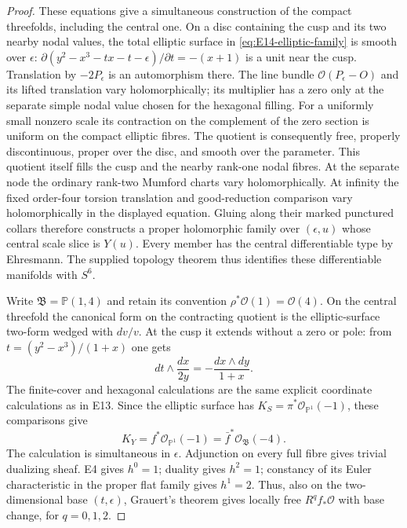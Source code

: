 \begin{proof}
These equations give a simultaneous construction of the compact
threefolds, including the central one. On a disc containing the cusp
and its two nearby nodal values, the total elliptic surface in
\eqref{eq:E14-elliptic-family} is smooth over $\epsilon$:
$\partial(y^2-x^3-tx-t-\epsilon)/\partial t=-(x+1)$ is a unit
near the cusp. Translation by $-2P_\epsilon$ is an automorphism
there. The line bundle $\mathcal O(P_\epsilon-O)$ and its lifted
translation vary holomorphically; its multiplier has a zero only
at the separate simple nodal value chosen for the hexagonal filling.
For a uniformly small nonzero scale its contraction on the
complement of the zero section is uniform on the compact elliptic
fibres. The quotient is consequently free, properly discontinuous,
proper over the disc, and smooth over the parameter. This quotient
itself fills the cusp and the nearby rank-one nodal fibres. At the
separate node the ordinary rank-two Mumford charts vary
holomorphically. At infinity the fixed order-four torsion translation
and good-reduction comparison vary holomorphically in the displayed
equation. Gluing along their marked punctured collars therefore
constructs a proper holomorphic family over $(\epsilon,u)$ whose
central scale slice is $Y(u)$. Every member has the central
differentiable type by Ehresmann. The supplied topology theorem
\cite[Theorem labelled \texttt{thm: main}]{LiuRollenske2026} thus
identifies these differentiable manifolds with $S^6$.

Write $\mathfrak B=\mathbb P(1,4)$ and retain its convention
$\rho^*\mathcal O(1)=\mathcal O(4)$. On the central threefold the
canonical form on the contracting quotient is the elliptic-surface
two-form wedged with $dv/v$. At the cusp it extends without a zero
or pole: from $t=(y^2-x^3)/(1+x)$ one gets
\[
 dt\wedge\frac{dx}{2y}=-\frac{dx\wedge dy}{1+x}.
\]
The finite-cover and hexagonal calculations are the same explicit
coordinate calculations as in E13. Since the elliptic surface has
$K_S=\pi^*\mathcal O_{\mathbb P^1}(-1)$, these comparisons give
\begin{equation}\label{eq:E14-canonical}
 K_Y=f^*\mathcal O_{\mathbb P^1}(-1)
     =\bar f^*\mathcal O_{\mathfrak B}(-4).
\end{equation}
The calculation is simultaneous in $\epsilon$. Adjunction on every
full fibre gives trivial dualizing sheaf. E4 gives $h^0=1$;
duality gives $h^2=1$; constancy of its Euler characteristic in the
proper flat family gives $h^1=2$. Thus, also on the two-dimensional
base $(t,\epsilon)$, Grauert's theorem gives locally free $R^qf_*\mathcal O$
with base change, for $q=0,1,2$.


\end{proof}
